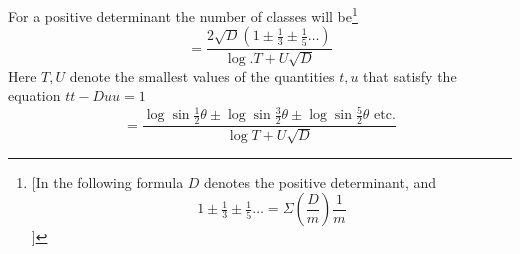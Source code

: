 For a positive determinant the number of classes will be\begingroup\renewcommand{\thefootnote}{**)}\footnote{[In the following formula $D$ denotes the positive determinant, and
\[
1\pm\tfrac13\pm\tfrac15\ldots=\Sigma\left(\frac Dm\right)\frac1m
\]
]}\endgroup
\[
=\frac{2\surd D(1\pm\tfrac13\pm\tfrac15\ldots)}{\log .T+U\surd D}
\]
Here $T,U$ denote the smallest values of the quantities $t,u$ that satisfy the equation $tt-Duu=1$
\[
=\frac{\log\sin\tfrac12\theta\pm\log\sin\tfrac32\theta\pm\log\sin\tfrac52\theta\text{ etc.}}{\log T+U\surd D}
\]
